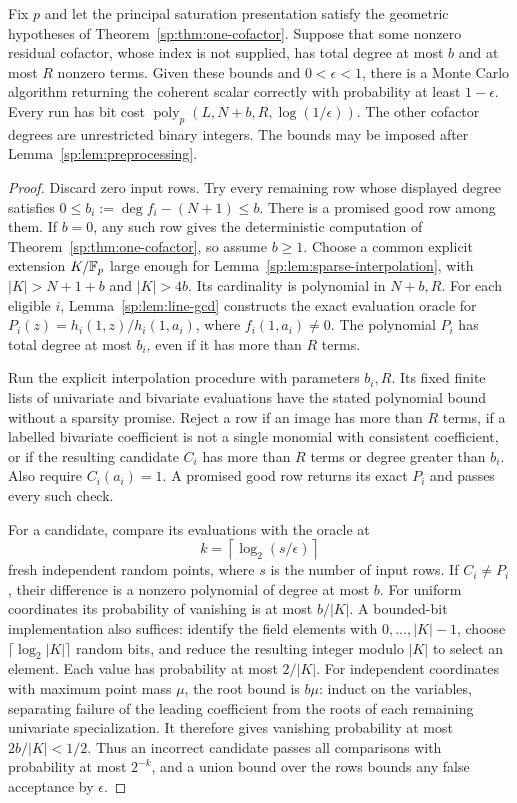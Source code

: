 \begin{corollary}
\label{sp:cor:unspecified-cofactor}
Fix $p$ and let the principal saturation presentation satisfy the
geometric hypotheses of Theorem~\ref{sp:thm:one-cofactor}. Suppose
that some nonzero residual cofactor, whose index is not supplied, has total
degree at most $b$ and at most $R$ nonzero terms. Given these bounds
and $0<\epsilon<1$, there is a Monte Carlo algorithm returning the
coherent scalar correctly with probability at least $1-\epsilon$.
Every run has bit cost
$\operatorname{poly}_p(L,N+b,R,\log(1/\epsilon))$.
The other cofactor degrees are unrestricted binary integers.
The bounds may be imposed after Lemma~\ref{sp:lem:preprocessing}.
\end{corollary}
\begin{proof}
Discard zero input rows. Try every remaining row whose displayed degree satisfies
$0\leq b_i:=\deg f_i-(N+1)\leq b$. There is a promised good row
among them. If $b=0$, any such row gives the deterministic computation
of Theorem~\ref{sp:thm:one-cofactor}, so assume $b\geq1$.
Choose a common explicit extension $K/\mathbb F_p$ large enough for
Lemma~\ref{sp:lem:sparse-interpolation}, with $|K|>N+1+b$ and
$|K|>4b$. Its cardinality is polynomial in $N+b,R$.
For each eligible $i$, Lemma~\ref{sp:lem:line-gcd} constructs the
exact evaluation oracle for
$P_i(z)=h_i(1,z)/h_i(1,a_i)$, where $f_i(1,a_i)\ne0$.
The polynomial $P_i$ has total degree at most $b_i$, even if it has
more than $R$ terms.

Run the explicit interpolation procedure with parameters $b_i,R$.
Its fixed finite lists of univariate and bivariate evaluations have
the stated polynomial bound without a sparsity promise. Reject a
row if an image has more than $R$ terms, if a labelled bivariate
coefficient is not a single monomial with consistent coefficient, or
if the resulting candidate $C_i$ has more than $R$ terms or degree
greater than $b_i$. Also require $C_i(a_i)=1$. A promised good row
returns its exact $P_i$ and passes every such check.

For a candidate, compare its evaluations with the oracle at
\[
 k=\left\lceil\log_2(s/\epsilon)\right\rceil
\]
fresh independent random points, where $s$ is the number of input
rows. If $C_i\ne P_i$, their difference is a nonzero polynomial of
degree at most $b$. For uniform coordinates its probability of
vanishing is at most $b/|K|$. A bounded-bit implementation also
suffices: identify the field elements with $0,\ldots,|K|-1$, choose
$\lceil\log_2|K|\rceil$ random bits, and reduce the resulting integer
modulo $|K|$ to select an element. Each value has probability at most
$2/|K|$. For independent coordinates with maximum point mass $\mu$,
the root bound is $b\mu$: induct on the variables, separating failure
of the leading coefficient from the roots of each remaining univariate
specialization. It therefore gives vanishing probability
at most $2b/|K|<1/2$. Thus an incorrect candidate passes all comparisons
with probability at most $2^{-k}$, and a union bound over the rows
bounds any false acceptance by $\epsilon$.


\end{proof}
